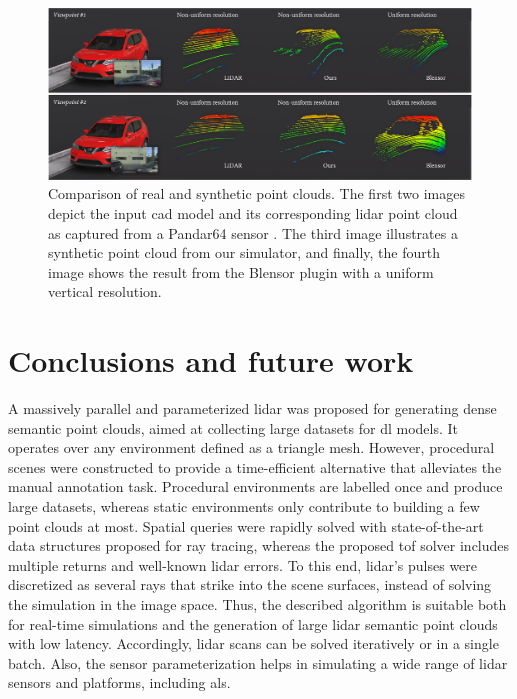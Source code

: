\begin{figure}
    \centering
    \includegraphics[width=\linewidth]{figs/lidar_simulation/lidar_point_cloud_comparison.png}
	\caption{Comparison of real and synthetic point clouds. The first two images depict the input \acrshort{cad} model and its corresponding \acrshort{lidar} point cloud as captured from a Pandar64 sensor \cite{hesai_pandaset_2021}. The third image illustrates a synthetic point cloud from our simulator, and finally, the fourth image shows the result from the Blensor plugin with a uniform vertical resolution. }
	\label{fig:lidar_point_cloud_comparison}
\end{figure}

\section{Conclusions and future work}

A massively parallel and parameterized \acrshort{lidar} was proposed for generating dense semantic point clouds, aimed at collecting large datasets for \acrshort{dl} models. It operates over any environment defined as a triangle mesh. However, procedural scenes were constructed to provide a time-efficient alternative that alleviates the manual annotation task. Procedural environments are labelled once and produce large datasets, whereas static environments only contribute to building a few point clouds at most. Spatial queries were rapidly solved with state-of-the-art data structures proposed for ray tracing, whereas the proposed \acrshort{tof} solver includes multiple returns and well-known \acrshort{lidar} errors. To this end, \acrshort{lidar}'s pulses were discretized as several rays that strike into the scene surfaces, instead of solving the simulation in the image space. Thus, the described algorithm is suitable both for real-time simulations and the generation of large \acrshort{lidar} semantic point clouds with low latency. Accordingly, \acrshort{lidar} scans can be solved iteratively or in a single batch. Also, the sensor parameterization helps in simulating a wide range of \acrshort{lidar} sensors and platforms, including \acrshort{als}.


